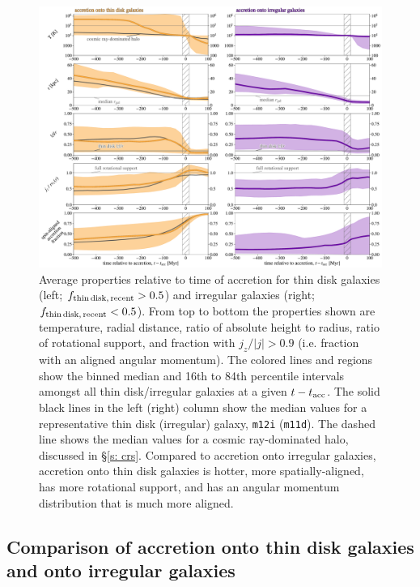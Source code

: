 \documentclass[fleqn,usenatbib]{mnras}
\newcommand{\fthin}{f_{\rm thin\,disk,\,recent}}
\newcommand{\tacc}{t_{\rm acc}}
\begin{document}
\begin{figure}
    \centering
    \includegraphics[width=\textwidth]{figures/variations/relative_to_accretion/before_and_after/before_and_after_combined.pdf}
    \caption{
    Average properties relative to time of accretion for thin disk galaxies (left; $\fthin>0.5$) and irregular galaxies (right; $\fthin<0.5$).
    From top to bottom the properties shown are temperature, radial distance, ratio of absolute height to radius, ratio of rotational support, and fraction with $j_z / \vert j \vert > 0.9$ (i.e. fraction with an aligned angular momentum).
    The colored lines and regions show the binned median and 16th to 84th percentile intervals amongst all thin disk/irregular galaxies at a given $t - \tacc$.
    The solid black lines in the left (right) column show the median values for a representative thin disk (irregular) galaxy, \texttt{m12i} (\texttt{m11d}).
    The dashed line shows the median values for a cosmic ray-dominated halo, discussed in \S\ref{s: crs}.
    Compared to accretion onto irregular galaxies, accretion onto thin disk galaxies is hotter, more spatially-aligned, has more rotational support, and has an angular momentum distribution that is much more aligned.
    }
    \label{f: before and after combined}
\end{figure}

\subsection{Comparison of accretion onto thin disk galaxies and onto irregular galaxies}
\end{document}
